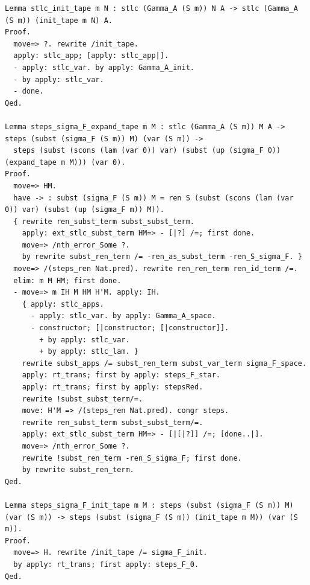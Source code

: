 \begin{lstlisting}
Lemma stlc_init_tape m N : stlc (Gamma_A (S m)) N A -> stlc (Gamma_A (S m)) (init_tape m N) A.
Proof.
  move=> ?. rewrite /init_tape.
  apply: stlc_app; [apply: stlc_app|].
  - apply: stlc_var. by apply: Gamma_A_init.
  - by apply: stlc_var.
  - done.
Qed.

Lemma steps_sigma_F_expand_tape m M : stlc (Gamma_A (S m)) M A -> steps (subst (sigma_F (S m)) M) (var (S m)) ->
  steps (subst (scons (lam (var 0)) var) (subst (up (sigma_F 0)) (expand_tape m M))) (var 0).
Proof.
  move=> HM.
  have -> : subst (sigma_F (S m)) M = ren S (subst (scons (lam (var 0)) var) (subst (up (sigma_F m)) M)).
  { rewrite ren_subst_term subst_subst_term.
    apply: ext_stlc_subst_term HM=> - [|?] /=; first done.
    move=> /nth_error_Some ?.
    by rewrite subst_ren_term /= -ren_as_subst_term -ren_S_sigma_F. }
  move=> /(steps_ren Nat.pred). rewrite ren_ren_term ren_id_term /=.
  elim: m M HM; first done.
  - move=> m IH M HM H'M. apply: IH.
    { apply: stlc_apps.
      - apply: stlc_var. by apply: Gamma_A_space.
      - constructor; [|constructor; [|constructor]].
        + by apply: stlc_var.
        + by apply: stlc_lam. }
    rewrite subst_apps /= subst_ren_term subst_var_term sigma_F_space.
    apply: rt_trans; first by apply: steps_F_star.
    apply: rt_trans; first by apply: stepsRed.
    rewrite !subst_subst_term/=.
    move: H'M => /(steps_ren Nat.pred). congr steps.
    rewrite ren_subst_term subst_subst_term/=.
    apply: ext_stlc_subst_term HM=> - [|[|?]] /=; [done..|].
    move=> /nth_error_Some ?.
    rewrite !subst_ren_term -ren_S_sigma_F; first done.
    by rewrite subst_ren_term.
Qed.

Lemma steps_sigma_F_init_tape m M : steps (subst (sigma_F (S m)) M) (var (S m)) -> steps (subst (sigma_F (S m)) (init_tape m M)) (var (S m)).
Proof.
  move=> H. rewrite /init_tape /= sigma_F_init.
  by apply: rt_trans; first apply: steps_F_0.
Qed.


\end{lstlisting}

